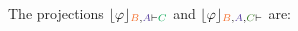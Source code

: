 \begin{example}
\noindent
The projections $\projection{\varphi}{\hC{B}, \hD{A} \seq \hE{C}}$ and $\projection{\varphi}{\hC{B}, \hD{A}, \hF{C} \seq}$ are:
\begin{multicols}{2}{
\begin{scriptsize}
\begin{prooftree}
				 
			 
							 
\end{prooftree}
\end{scriptsize}

\begin{scriptsize}
\begin{prooftree}
					 
				 
									 
									 
\end{prooftree}
\end{scriptsize}
}
\end{multicols}
\hfill\QED
\end{example}

\clearpage


